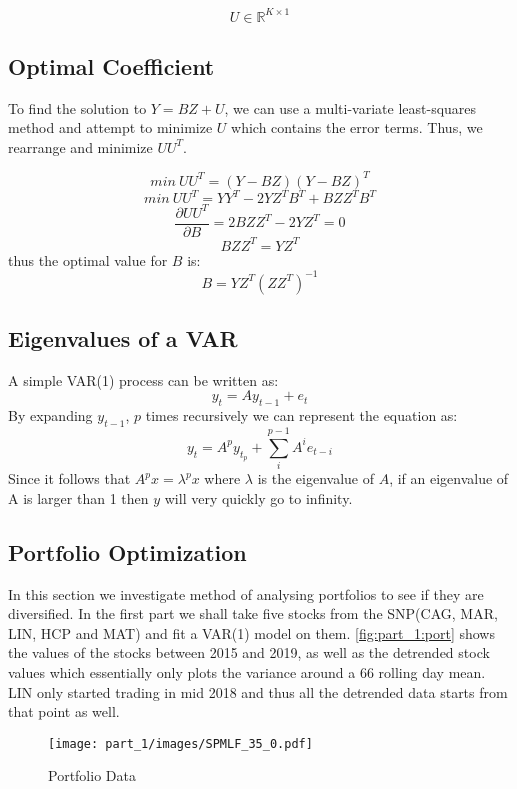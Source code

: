\[U \in \mathbb{R}^{K\times 1}\]


\subsection{Optimal Coefficient}

To find the solution to $Y = BZ + U$, we can use a multi-variate least-squares method and attempt to minimize $U$ which contains the error terms. Thus, we rearrange and minimize $UU^T$.
  
\[min\:UU^T = (Y-BZ)(Y-BZ)^T\]  
\[min\:UU^T = YY^T - 2YZ^TB^T + BZZ^TB^T\]   
\[\frac{\partial UU^T}{\partial B} = 2BZZ^T - 2YZ^T = 0\]   
\[ BZZ^T = YZ^T \]   
thus the optimal value for $B$ is:  
\[B = YZ^T(ZZ^T)^{-1}\]  

\subsection{Eigenvalues of a VAR}

A simple VAR(1) process can be written as:  
\[y_t = Ay_{t-1} + e_t\]
By expanding $y_{t-1}$, $p$ times recursively we can represent the equation as:  
\[y_t = A^py_{t_p} + \sum_i^{p-1}A^ie_{t-i}\]
Since it follows that $A^px = \lambda^px$ where $\lambda$ is the eigenvalue of $A$, if an eigenvalue of A is larger than 1 then $y$ will very quickly go to infinity.

\subsection{Portfolio Optimization}

In this section we investigate method of analysing portfolios to see if they are diversified. In the first part we shall take five stocks from the SNP(CAG, MAR, LIN, HCP and MAT) and fit a VAR(1) model on them. \autoref{fig:part_1:port} shows the values of the stocks between 2015 and 2019, as well as the detrended stock values which essentially only plots the variance around a 66 rolling day mean. LIN only started trading in mid 2018 and thus all the detrended data starts from that point as well.

\begin{figure}[!htb]
    \centering
    \texttt{[image: part\_1/images/SPMLF\_35\_0.pdf]}
    \caption{Portfolio Data}
    \label{fig:part_1:port}
\end{figure}

